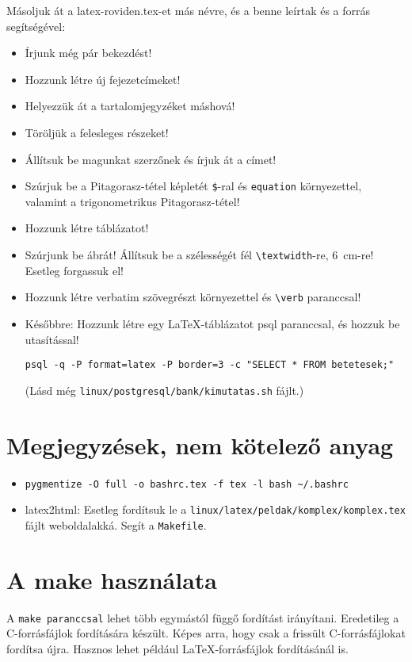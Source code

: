 \documentclass[a4paper]{article}
\newcommand{\code}{\texttt}
\begin{document}
Másoljuk át a latex-roviden.tex-et más névre, és a benne leírtak
és a forrás segítségével:
\begin{itemize}
\item Írjunk még pár bekezdést!
\item Hozzunk létre új fejezetcímeket!
\item Helyezzük át a tartalomjegyzéket máshová!
\item Töröljük a felesleges részeket!
\item Állítsuk be magunkat szerzőnek és írjuk át a címet!
\item Szúrjuk be a Pitagorasz-tétel képletét \verb+$+-ral és
 \code{equation} környezettel, valamint a trigonometrikus
 Pitagorasz-tétel!
\item Hozzunk létre táblázatot!
\item Szúrjunk be ábrát! Állítsuk be a szélességét fél
\verb+\textwidth+-re, 6~cm-re! Esetleg forgassuk el!
\item Hozzunk létre verbatim szövegrészt környezettel és \verb+\verb+
paranccsal!
\item Későbbre: Hozzunk létre egy \LaTeX-táblázatot psql paranccsal, és
 hozzuk be \verb++ utasítással!
\begin{Verbatim}
psql -q -P format=latex -P border=3 -c "SELECT * FROM betetesek;"
\end{Verbatim}
 (Lásd még \verb!linux/postgresql/bank/kimutatas.sh! fájlt.)
\end{itemize}

\section{Megjegyzések, nem kötelező anyag}
\begin{itemize}
\item
\begin{Verbatim}
pygmentize -O full -o bashrc.tex -f tex -l bash ~/.bashrc
\end{Verbatim}

\item latex2html: Esetleg fordítsuk le a 
\verb!linux/latex/peldak/komplex/komplex.tex! fájlt weboldalakká. Segít
a \verb!Makefile!.
\end{itemize}

\section{A make használata}
A \texttt{make paranccsal} lehet több egymástól függő fordítást irányítani.
Eredetileg a C-forrásfájlok fordítására készült. Képes arra, hogy csak a
frissült C-forrásfájlokat fordítsa újra. Hasznos lehet
például \LaTeX-forrásfájlok fordításánál is.
\end{document}
